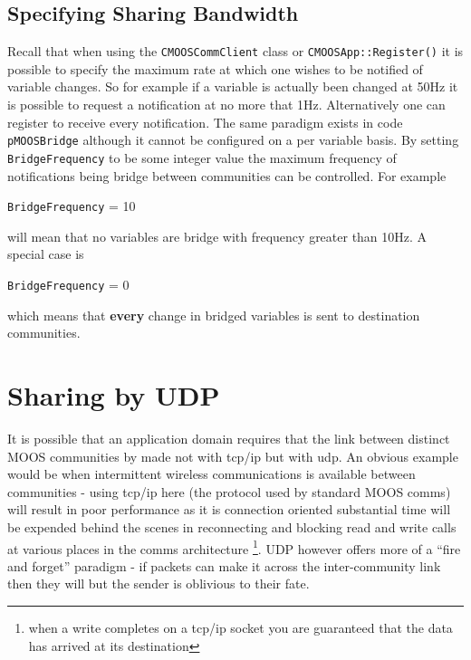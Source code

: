 \documentclass[a4paper,10pt]{article}
\newcommand{\Code}[1]{\texttt{#1} }
\newcommand{\code}[1]{\Code{#1} }
\begin{document}
\subsection{Specifying Sharing Bandwidth}

Recall  that when using the \code{CMOOSCommClient} class or \code{CMOOSApp::Register()}  it is possible to specify the maximum rate at which one wishes to be notified of variable changes. So for example if a variable is actually been changed at 50Hz it is possible to request a notification at no more that 1Hz. Alternatively one can register to receive every notification. The same paradigm exists in code \code{pMOOSBridge} although it cannot be configured on a per variable basis. By setting \code{BridgeFrequency} to be some integer value the maximum frequency of notifications being bridge between communities can be controlled. For example
\begin{center}
\code{BridgeFrequency} = 10
\end{center}
will mean that no variables are bridge with frequency greater than 10Hz. A special case is
\begin{center}
\code{BridgeFrequency} = 0
\end{center}
which means that {\textbf{every}} change in bridged variables is sent to destination communities.


\section{Sharing by UDP}

It is possible that an application domain requires that the link between distinct MOOS communities by made not with tcp/ip but with udp. An obvious example would be when intermittent wireless communications is available between 
communities  - using tcp/ip here (the protocol used by standard MOOS comms) will result in poor performance as it is connection oriented substantial time will be expended behind the scenes in reconnecting and blocking read and write calls at various places in the comms architecture \footnote{when a write completes on a tcp/ip socket you are guaranteed that the data has arrived at its destination}. UDP however offers more of a ``fire and forget'' paradigm - if packets can make it across the inter-community link then they will but the sender is oblivious to their fate.
\end{document}
